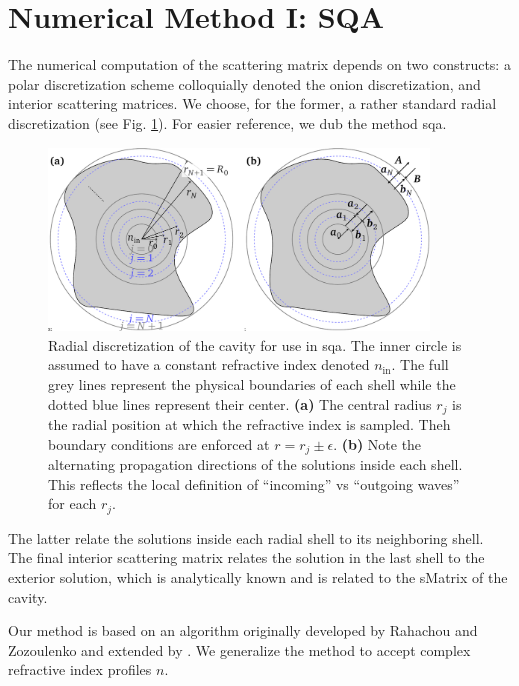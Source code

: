 \section{Numerical Method I: SQA}
The numerical computation of the scattering matrix 
depends on two constructs: a polar discretization 
scheme colloquially denoted the onion discretization, and interior scattering matrices. We choose, for
the former, a rather standard radial discretization 
(see Fig. \ref{fig:passive.numerical.radialDiscretization}).
For easier reference, we dub the method \gls{sqa}.

\begin{figure}
 \centering
 \includegraphics[width=0.9\textwidth]{figs/passive/figDisScatCoeff.pdf}
 \caption[Radial discretization for use in SQA]
	 {Radial discretization of the cavity for use in \gls{sqa}. The inner circle is assumed to 
	 have a constant refractive index denoted $n_\text{in}$. The full grey lines represent
	 the physical boundaries of each shell while the dotted blue lines represent their
	 center. \textbf{(a)} The central radius $r_j$ is the radial position at which the 
	 refractive index is sampled. Theh boundary conditions are enforced at $r=r_j\pm\epsilon$.
	 \textbf{(b)} Note the alternating propagation directions of the solutions inside each shell.
	 This reflects the local definition of ``incoming'' vs ``outgoing waves'' for each $r_j$.}
  \label{fig:passive.numerical.radialDiscretization}
\end{figure}

The latter relate the solutions
inside each radial shell to its neighboring shell. The final
interior scattering matrix relates the solution in the last shell
to the exterior solution, which is analytically known and is 
related to the \gls{sMatrix} of the cavity.

Our method is based on an algorithm originally developed by 
Rahachou and Zozoulenko \cite{RAH2004} and extended by \cite{GAP2013a}. 
We generalize the method to accept complex refractive index
profiles $n$.

